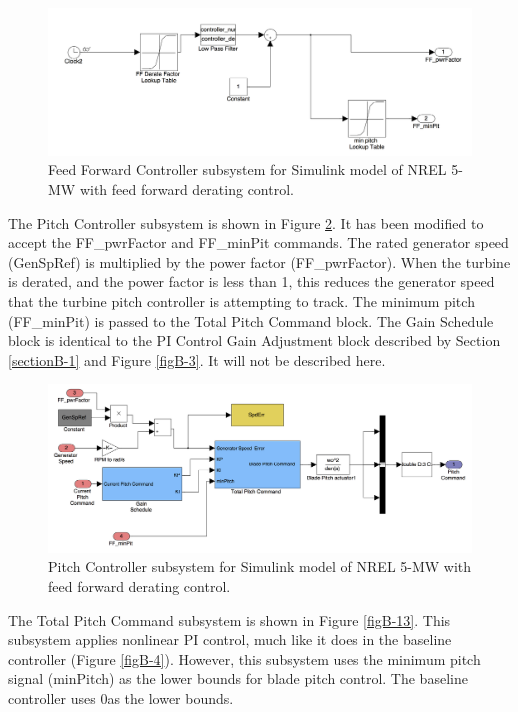 \begin{figure}[ht]
	\centering
		\includegraphics[width=\linewidth]{Figures/AppendixBFigures/FF_Derate2.png}
	\caption{Feed Forward Controller subsystem for Simulink model of NREL 5-MW with feed forward derating control.}
	\label{figB-11}
\end{figure}

The Pitch Controller subsystem is shown in Figure \ref{figB-12}. It has been modified to accept the FF\_pwrFactor and FF\_minPit commands. The rated generator speed (GenSpRef) is multiplied by the power factor (FF\_pwrFactor). When the turbine is derated, and the power factor is less than 1, this reduces the generator speed that the turbine pitch controller is attempting to track. The minimum pitch (FF\_minPit) is passed to the Total Pitch Command block. The Gain Schedule block is identical to the PI Control Gain Adjustment block described by Section \ref{sectionB-1} and Figure \ref{figB-3}. It will not be described here. 

\begin{figure}[ht]
	\centering
		\includegraphics[width=\linewidth]{Figures/AppendixBFigures/FF_Derate3.png}
	\caption{Pitch Controller subsystem for Simulink model of NREL 5-MW with feed forward derating control.}
	\label{figB-12}
\end{figure}

The Total Pitch Command subsystem is shown in Figure \ref{figB-13}. This subsystem applies nonlinear PI control, much like it does in the baseline controller (Figure \ref{figB-4}). However, this subsystem uses the minimum pitch signal (minPitch)  as the lower bounds for blade pitch control. The baseline controller uses 0\degree as the lower bounds.


